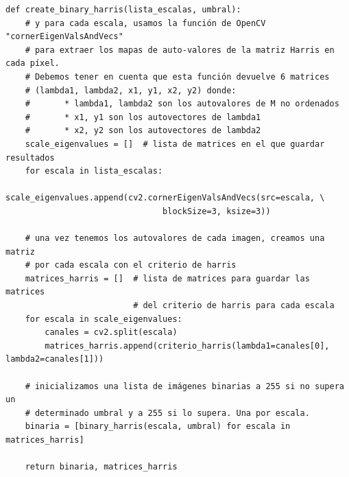 \documentclass[11pt,a4paper]{article}
\theoremstyle{plain}
\theoremstyle{definition}
\begin{document}
\begin{verbatim}
def create_binary_harris(lista_escalas, umbral):
    # y para cada escala, usamos la función de OpenCV "cornerEigenValsAndVecs" 
    # para extraer los mapas de auto-valores de la matriz Harris en cada píxel. 
    # Debemos tener en cuenta que esta función devuelve 6 matrices 
    # (lambda1, lambda2, x1, y1, x2, y2) donde:
    #       * lambda1, lambda2 son los autovalores de M no ordenados
    #       * x1, y1 son los autovectores de lambda1
    #       * x2, y2 son los autovectores de lambda2
    scale_eigenvalues = []  # lista de matrices en el que guardar resultados
    for escala in lista_escalas:
        scale_eigenvalues.append(cv2.cornerEigenValsAndVecs(src=escala, \
                                blockSize=3, ksize=3))

    # una vez tenemos los autovalores de cada imagen, creamos una matriz 
    # por cada escala con el criterio de harris
    matrices_harris = []  # lista de matrices para guardar las matrices 
                          # del criterio de harris para cada escala
    for escala in scale_eigenvalues:
        canales = cv2.split(escala) 
        matrices_harris.append(criterio_harris(lambda1=canales[0], lambda2=canales[1]))

    # inicializamos una lista de imágenes binarias a 255 si no supera un 
    # determinado umbral y a 255 si lo supera. Una por escala.
    binaria = [binary_harris(escala, umbral) for escala in matrices_harris]

    return binaria, matrices_harris
\end{verbatim}
\end{document}
